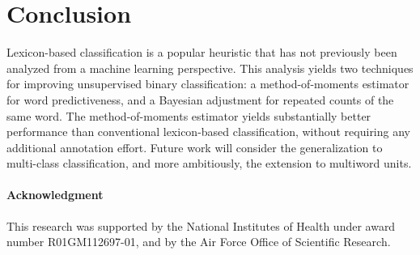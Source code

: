 \section{Conclusion}
Lexicon-based classification is a popular heuristic that has not previously been analyzed from a machine learning perspective. This analysis yields two techniques for improving unsupervised binary classification: a method-of-moments estimator for word predictiveness, and a Bayesian adjustment for repeated counts of the same word. The method-of-moments estimator yields substantially better performance than conventional lexicon-based classification, without requiring any additional annotation effort. Future work will consider the generalization to multi-class classification, and more ambitiously, the extension to multiword units.

\vspace{-9pt}
\begin{small}
\paragraph{Acknowledgment} This research was supported by the National Institutes of Health under award number R01GM112697-01, and by the Air Force Office of Scientific Research.
\end{small}
